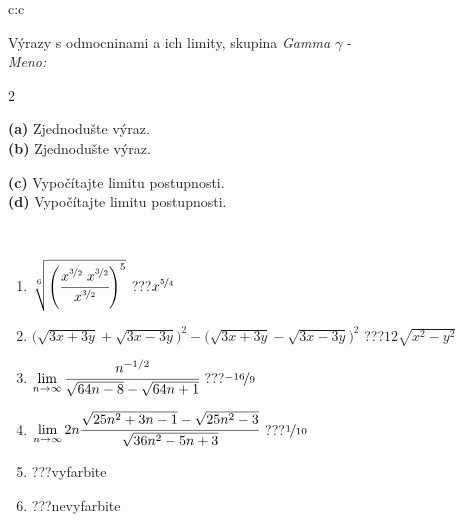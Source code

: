 \documentclass[10pt]{report}
\begin{document}
\begin{tabular}{c:c}
\begin{minipage}[c][104.5mm][t]{0.5\linewidth}
\begin{center}
\vspace{7mm}
{\huge {\Large Výrazy s odmocninami a ich limity}, skupina \textit{Gamma $\gamma$} -}\\[5mm]
\textit{Meno:}\phantom{xxxxxxxxxxxxxxxxxxxxxxxxxxxxxxxxxxxxxxxxxxxxxxxxxxxxxxxxxxxxxxxxx}\\[5mm]
\begin{minipage}{0.95\linewidth}
\begin{center}
{\small \begin{multicols}{2} \raggedright
\phantom{xxxxxxxxx}\textbf{(a)} Zjednodušte výraz. \\[1mm]
\phantom{xxxxxxxxx}\textbf{(b)} Zjednodušte výraz. \par \columnbreak
\textbf{(c)} Vypočítajte limitu postupnosti. \\[1mm]
\textbf{(d)} Vypočítajte limitu postupnosti.
\end{multicols}
}
\end{center}
\end{minipage}
\\[4mm]
\begin{minipage}{0.79\linewidth}
\begin{center}
\begin{varwidth}{\linewidth}
\begin{enumerate}
\small
\item $\sqrt[6]{\left(\cfrac{x^{\nicefrac{3}{2}}\;x^{\nicefrac{3}{2}}}{x^{\nicefrac{3}{2}}}\right)^{5}}$\quad \dotfill\; ???\;\dotfill \quad $x^{\nicefrac{5}{4}}$
\item {\footnotesize{\scriptsize$\big(\sqrt{3x+3y}+\sqrt{3x-3y}\big)^2-\big(\sqrt{3x+3y}-\sqrt{3x-3y}\big)^2$}\quad \dotfill\; ???\;\dotfill \quad $12\sqrt{x^2-y^2}$}
\item $\lim\limits_{n\to\infty}\cfrac{n^{-1/2}}{\sqrt{64n-8}-\sqrt{64n+1}}$\quad \dotfill\; ???\;\dotfill \quad $\nicefrac{-16}{9}$
\item $\lim\limits_{n\to\infty}2n\cfrac{\sqrt{25n^2+3n-1}-\sqrt{25n^2-3}}{\sqrt{36n^2-5n+3}}$\quad \dotfill\; ???\;\dotfill \quad $\nicefrac{1}{10}$
\item \quad \dotfill\; ???\;\dotfill \quad vyfarbite
\item \quad \dotfill\; ???\;\dotfill \quad nevyfarbite
\end{enumerate}
\end{varwidth}

\end{center}
\end{minipage}
\end{center}
\end{minipage}
\end{tabular}
\end{document}
